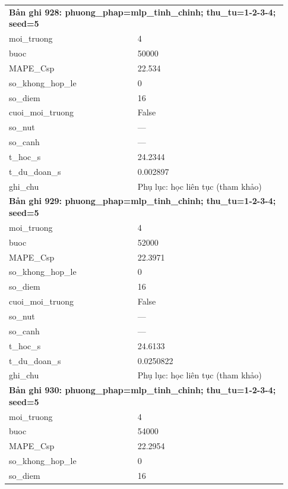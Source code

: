 \begin{longtable}{p{0.43\linewidth}p{0.50\linewidth}}
\midrule
\multicolumn{2}{p{0.95\linewidth}}{\textbf{Bản ghi 928: phuong\_phap=mlp\_tinh\_chinh; thu\_tu=1-2-3-4; seed=5}} \\
moi\_\allowbreak truong & 4 \\
buoc & 50000 \\
MAPE\_\allowbreak Csp & 22.534 \\
so\_\allowbreak khong\_\allowbreak hop\_\allowbreak le & 0 \\
so\_\allowbreak diem & 16 \\
cuoi\_\allowbreak moi\_\allowbreak truong & False \\
so\_\allowbreak nut & — \\
so\_\allowbreak canh & — \\
t\_\allowbreak hoc\_\allowbreak s & 24.2344 \\
t\_\allowbreak du\_\allowbreak doan\_\allowbreak s & 0.002897 \\
ghi\_\allowbreak chu & Phụ lục: học liên tục (tham khảo) \\
\midrule
\multicolumn{2}{p{0.95\linewidth}}{\textbf{Bản ghi 929: phuong\_phap=mlp\_tinh\_chinh; thu\_tu=1-2-3-4; seed=5}} \\
moi\_\allowbreak truong & 4 \\
buoc & 52000 \\
MAPE\_\allowbreak Csp & 22.3971 \\
so\_\allowbreak khong\_\allowbreak hop\_\allowbreak le & 0 \\
so\_\allowbreak diem & 16 \\
cuoi\_\allowbreak moi\_\allowbreak truong & False \\
so\_\allowbreak nut & — \\
so\_\allowbreak canh & — \\
t\_\allowbreak hoc\_\allowbreak s & 24.6133 \\
t\_\allowbreak du\_\allowbreak doan\_\allowbreak s & 0.0250822 \\
ghi\_\allowbreak chu & Phụ lục: học liên tục (tham khảo) \\
\midrule
\multicolumn{2}{p{0.95\linewidth}}{\textbf{Bản ghi 930: phuong\_phap=mlp\_tinh\_chinh; thu\_tu=1-2-3-4; seed=5}} \\
moi\_\allowbreak truong & 4 \\
buoc & 54000 \\
MAPE\_\allowbreak Csp & 22.2954 \\
so\_\allowbreak khong\_\allowbreak hop\_\allowbreak le & 0 \\
so\_\allowbreak diem & 16 \\

\end{longtable}
